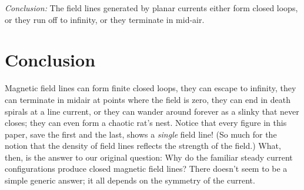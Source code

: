 \documentclass[aps,prb,twocolumn,groupedaddress,noshowpacs,checklength,amsmath]{revtex4-1}
\begin{document}
{\it Conclusion:} The field lines generated by planar currents either form closed loops, or they run off to infinity, or they terminate in mid-air.\cite{TTIM}


\section{Conclusion}
Magnetic field lines can form finite closed loops, they can escape to infinity, they can terminate in midair at points where the field is zero, they can end in death spirals at a line current, or they can wander around forever as a slinky that never closes; they can even form a chaotic rat's nest.  Notice that every figure in this paper, save the first and the last, shows a {\it single} field line!  (So  much for the notion that the density of field lines reflects the strength of the field.)  What, then, is the answer to our original question:  Why do the familiar steady current configurations produce closed magnetic field lines?  There doesn't seem to be a simple generic answer; it all depends on the symmetry of the current.
\end{document}
